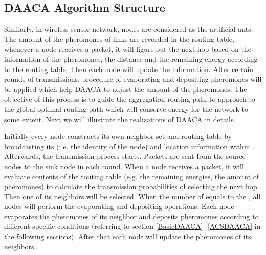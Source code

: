 \documentclass{elsarticle}
\begin{document}
\subsection{DAACA Algorithm Structure} \label{DAACAAlgorithmStructure}



Similarly, in wireless sensor network, nodes are considered as the artificial ants. The amount of the pheromones of links are recorded in the routing table, whenever a node receives a packet, it will figure out the next hop based on the information of the pheromones, the distance and the remaining energy according to the routing table. Then each node will update the information. After certain rounds of transmissions, procedure of evaporating and depositing pheromones will be applied which help DAACA to adjust the amount of the pheromones. The objective of this process is to guide the aggregation routing path to approach to the global optimal routing path which will conserve energy for the network to some extent. Next we will illustrate the realizations of DAACA in details.


Initially every node constructs its own neighbor set and routing table by broadcasting its  (i.e. the identity of the node) and location information within . Afterwards, the transmission process starts. Packets are sent from the source nodes to the sink node in each round. When a node receives a packet, it will evaluate contents of the routing table (e.g. the remaining energies, the amount of pheromones) to calculate the transmission probabilities of selecting the next hop. Then one of its neighbors will be selected. When the number of  equals to the , all nodes will perform the evaporating and depositing operations. Each node evaporates the pheromones of its neighbor and deposits pheromones according to different specific conditions (referring to section \ref{BasicDAACA}- \ref{ACSDAACA} in the following sections). After that each node will update the pheromones of its neighbors.
\end{document}
